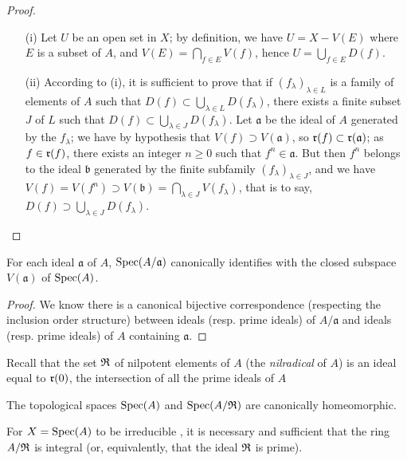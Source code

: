 \begin{proof}
\label{proof-1.1.1.10}
\medskip\noindent
\begin{itemize}
  \item[(i)] Let $U$ be an open set in $X$; by definition, we have $U=X-V(E)$ where $E$ is a subset of
    $A$, and $V(E)=\bigcap_{f\in E}V(f)$, hence $U=\bigcup_{f\in E}D(f)$.
  \item[(ii)] According to (i), it is sufficient to prove that if $(f_\lambda)_{\lambda\in L}$ is a
    family of elements of $A$ such that $D(f)\subset\bigcup_{\lambda\in L}D(f_\lambda)$, there
    exists a finite subset $J$ of $L$ such that $D(f)\subset\bigcup_{\lambda\in J}D(f_\lambda)$.
    Let $\mathfrak{a}$ be the ideal of $A$ generated by the $f_\lambda$; we have by hypothesis
    that $V(f)\supset V(\mathfrak{a})$, so $\mathfrak{r}(f)\subset\mathfrak{r}(\mathfrak{a})$; as $f\in\mathfrak{r}(f)$,
    there exists an integer $n\geqslant 0$ such that $f^n\in\mathfrak{a}$. But then $f^n$ belongs
    to the ideal $\mathfrak{b}$ generated by the finite subfamily $(f_\lambda)_{\lambda\in J}$,
    and we have $V(f)=V(f^n)\supset V(\mathfrak{b})=\bigcap_{\lambda\in J}V(f_\lambda)$, that is
    to say, $D(f)\supset\bigcup_{\lambda\in J}D(f_\lambda)$.
\end{itemize}
\end{proof}

\begin{prop}[1.1.11]
\label{1.1.1.11}
For each ideal $\mathfrak{a}$ of $A$, ${\mathop{\mathrm{Spec}}\nolimits}(A/\mathfrak{a})$ canonically identifies with the
closed subspace $V(\mathfrak{a})$ of ${\mathop{\mathrm{Spec}}\nolimits}(A)$.
\end{prop}

\begin{proof}
\label{proof-1.1.1.11}
We know there is a canonical bijective correspondence (respecting the inclusion order
structure) between ideals (resp. prime ideals) of $A/\mathfrak{a}$ and ideals (resp. prime
ideals) of $A$ containing $\mathfrak{a}$.
\end{proof}

Recall that the set $\mathfrak{R}$ of nilpotent elements of $A$ (the {\em nilradical} of $A$) is
an ideal equal to $\mathfrak{r}(0)$, the intersection of all the prime ideals of $A$

\begin{cor}[1.1.12]
\label{1.1.1.12}
The topological spaces ${\mathop{\mathrm{Spec}}\nolimits}(A)$ and ${\mathop{\mathrm{Spec}}\nolimits}(A/\mathfrak{R})$ are canonically homeomorphic.
\end{cor}

\begin{prop}[1.1.13]
\label{1.1.1.13}
For $X={\mathop{\mathrm{Spec}}\nolimits}(A)$ to be irreducible , it is necessary and
sufficient that the ring $A/\mathfrak{R}$ is integral (or, equivalently, that the ideal $\mathfrak{R}$ is prime).
\end{prop}

